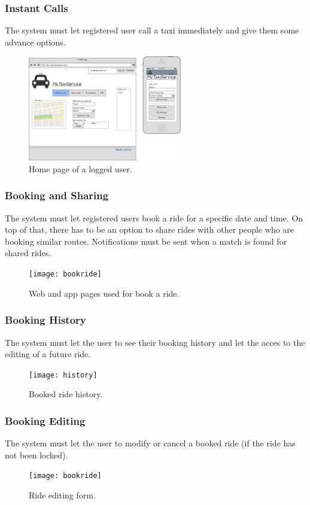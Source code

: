 		\subsubsection {Instant Calls}
			The system must let registered user call a taxi immediately and give them some advance options.
			\begin{figure}[h!]
				\includegraphics[width=0.6\textwidth]{homelog}
				\caption{Home page of a logged user.}
			\end{figure}
			\newpage
		\subsubsection {Booking and Sharing}
			The system must let registered users book a ride for a specific date and time. On top of that, there has to be an option to share
			rides with other people who are booking similar routes. Notifications must be sent when a match is found for shared rides.
			\begin{figure}[h!]
				\texttt{[image: bookride]}
				\caption{Web and app pages used for book a ride.}
			\end{figure}
			\newpage
		\subsubsection {Booking History}
			The system must let the user to see their booking history and let the acces to the editing of a future ride.
			\begin{figure}[h!]
				\texttt{[image: history]}
				\caption{Booked ride history.}
			\end{figure}
		\subsubsection {Booking Editing}
			The system must let the user to modify or cancel a booked ride (if the ride has not been locked).
			\begin{figure}[h!]
				\texttt{[image: bookride]}
				\caption{Ride editing form.}
			\end{figure}
			\newpage
